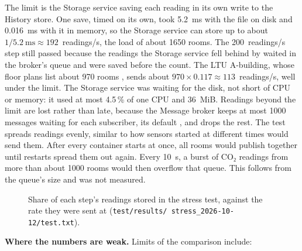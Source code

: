 \documentclass[11pt]{article}
\begin{document}
The limit is the Storage service saving each reading in its own write
to the History store. One save, timed on its own, took 5.2~ms with the
file on disk and 0.016~ms with it in memory, so the Storage service
can store up to about $1/5.2~\text{ms} \approx 192$~readings/s, the load of
about 1650 rooms. The 200~readings/s step still passed because the
readings the Storage service fell behind by waited in the broker's
queue and were saved before the count. The LTU A-building, whose floor plans list about 970
rooms \cite{buildsim}, sends about $970 \times 0.117 \approx
113$~readings/s, well under the limit. The Storage service was waiting
for the disk, not short of CPU or memory: it used at most 4.5\,\% of one CPU and 36~MiB. Readings
beyond the limit are lost rather than late, because the Message broker
keeps at most 1000 messages waiting for each subscriber, its default
\cite{mosquittoconf}, and drops the rest. The test spreads readings evenly, similar to how sensors started
at different times would send them. After every container starts at once, all
rooms would publish together until restarts spread them out again.
Every 10~s, a burst of CO₂ readings from more than about 1000 rooms
would then overflow that queue. This
follows from the queue's size and was not measured.

\begin{figure}[H]
\centering
{}
\caption{Share of each step's readings stored in the stress test, against
the rate they were sent at (\texttt{test/results/\allowbreak
stress\_2026-10-12/test.txt}).}
\label{fig:stress}
\end{figure}

\textbf{Where the numbers are weak.} Limits of the comparison include:
\end{document}
